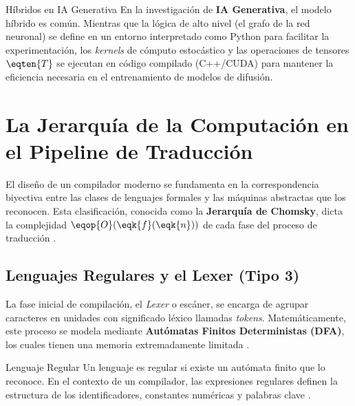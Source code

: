 \begin{fisicaconexion}{Híbridos en IA Generativa}
En la investigación de \textbf{IA Generativa}, el modelo híbrido es común. Mientras que la lógica de alto nivel (el grafo de la red neuronal) se define en un entorno interpretado como Python para facilitar la experimentación, los \textit{kernels} de cómputo estocástico y las operaciones de tensores $\eqten{T}$ se ejecutan en código compilado (C++/CUDA) para mantener la eficiencia necesaria en el entrenamiento de modelos de difusión.
\end{fisicaconexion}



\section{La Jerarquía de la Computación en el Pipeline de Traducción}
\label{sec:1_4_jerarquia_computacion}

El diseño de un compilador moderno se fundamenta en la correspondencia biyectiva entre las clases de lenguajes formales y las máquinas abstractas que los reconocen. Esta clasificación, conocida como la \textbf{Jerarquía de Chomsky}, dicta la complejidad $\eqop{O}(\eqk{f}(\eqk{n}))$ de cada fase del proceso de traducción \cite{sipser2012introduction}.

\subsection{Lenguajes Regulares y el Lexer (Tipo 3)}

La fase inicial de compilación, el \textit{Lexer} o escáner, se encarga de agrupar caracteres en unidades con significado léxico llamadas \textit{tokens}. Matemáticamente, este proceso se modela mediante \textbf{Autómatas Finitos Deterministas (DFA)}, los cuales tienen una memoria extremadamente limitada \cite{aho2006compilers,sipser2012introduction}.

\begin{definicion}{Lenguaje Regular}
Un lenguaje es regular si existe un autómata finito que lo reconoce. En el contexto de un compilador, las expresiones regulares definen la estructura de los identificadores, constantes numéricas y palabras clave \cite{aho2006compilers,sipser2012introduction}.
\end{definicion}

